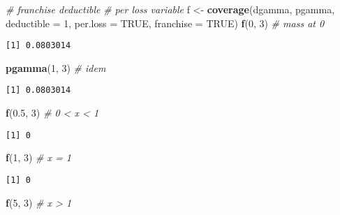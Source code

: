 \documentclass[]{book}
\newenvironment{Shaded}{\begin{snugshade}}{\end{snugshade}}
\newcommand{\KeywordTok}[1]{\textcolor[rgb]{0.13,0.29,0.53}{\textbf{#1}}}
\newcommand{\DataTypeTok}[1]{\textcolor[rgb]{0.13,0.29,0.53}{#1}}
\newcommand{\DecValTok}[1]{\textcolor[rgb]{0.00,0.00,0.81}{#1}}
\newcommand{\FloatTok}[1]{\textcolor[rgb]{0.00,0.00,0.81}{#1}}
\newcommand{\StringTok}[1]{\textcolor[rgb]{0.31,0.60,0.02}{#1}}
\newcommand{\CommentTok}[1]{\textcolor[rgb]{0.56,0.35,0.01}{\textit{#1}}}
\newcommand{\OtherTok}[1]{\textcolor[rgb]{0.56,0.35,0.01}{#1}}
\newcommand{\NormalTok}[1]{#1}
\theoremstyle{definition}
\theoremstyle{definition}
\theoremstyle{definition}
\theoremstyle{remark}
\begin{document}
\begin{Shaded}
\begin{Highlighting}[]
\CommentTok{# franchise deductible}
\CommentTok{# per loss variable}
\NormalTok{f <-}\StringTok{ }\KeywordTok{coverage}\NormalTok{(dgamma, pgamma, }\DataTypeTok{deductible =} \DecValTok{1}\NormalTok{,}
\DataTypeTok{per.loss =} \OtherTok{TRUE}\NormalTok{, }\DataTypeTok{franchise =} \OtherTok{TRUE}\NormalTok{)}
\KeywordTok{f}\NormalTok{(}\DecValTok{0}\NormalTok{, }\DecValTok{3}\NormalTok{)       }\CommentTok{# mass at 0}
\end{Highlighting}
\end{Shaded}

\begin{verbatim}
[1] 0.0803014
\end{verbatim}

\begin{Shaded}
\begin{Highlighting}[]
\KeywordTok{pgamma}\NormalTok{(}\DecValTok{1}\NormalTok{, }\DecValTok{3}\NormalTok{)  }\CommentTok{# idem}
\end{Highlighting}
\end{Shaded}

\begin{verbatim}
[1] 0.0803014
\end{verbatim}

\begin{Shaded}
\begin{Highlighting}[]
\KeywordTok{f}\NormalTok{(}\FloatTok{0.5}\NormalTok{, }\DecValTok{3}\NormalTok{) }\CommentTok{# 0 < x < 1}
\end{Highlighting}
\end{Shaded}

\begin{verbatim}
[1] 0
\end{verbatim}

\begin{Shaded}
\begin{Highlighting}[]
\KeywordTok{f}\NormalTok{(}\DecValTok{1}\NormalTok{, }\DecValTok{3}\NormalTok{)   }\CommentTok{# x = 1}
\end{Highlighting}
\end{Shaded}

\begin{verbatim}
[1] 0
\end{verbatim}

\begin{Shaded}
\begin{Highlighting}[]
\KeywordTok{f}\NormalTok{(}\DecValTok{5}\NormalTok{, }\DecValTok{3}\NormalTok{)   }\CommentTok{# x > 1}
\end{Highlighting}
\end{Shaded}
\end{document}
